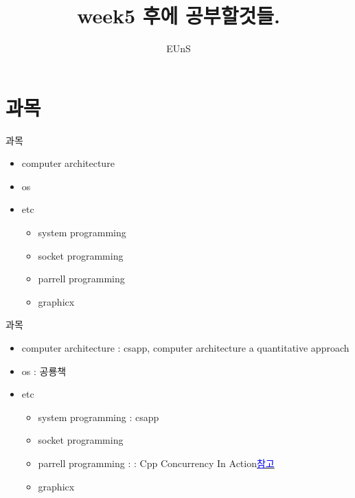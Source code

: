 \documentclass[10pt]{beamer}
\title{week5 후에 공부할것들.}
\author{EUnS}
\begin{document}
\begin{frame}
    \tableofcontents
\end{frame}    

\section{과목}

\begin{frame}{과목}
    \begin{itemize}
        \item computer architecture
        \item os
        \item etc
        \begin{itemize}
            \item system programming
            \item socket programming
            \item parrell programming
            \item graphicx
        \end{itemize}
    \end{itemize}
\end{frame}

\begin{frame}{과목}
    \begin{itemize}
        \item computer architecture : csapp, computer architecture a quantitative approach
        \item os : 공룡책
        \item etc
        \begin{itemize}
            \item system programming : csapp
            \item socket programming 
            \item parrell programming : : Cpp Concurrency In Action\href{https://github.com/CppKorea/CppConcurrencyInAction}{\textcolor{blue}{참고}}
            \item graphicx
        \end{itemize}
    \end{itemize}
\end{frame}
\end{document}
